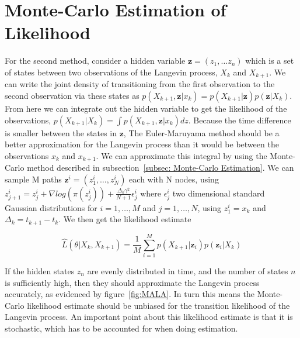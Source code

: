\section{Monte-Carlo Estimation of Likelihood}
\label{sec: Monte-Carlo Estimation}
For the second method, consider a hidden variable $\textbf{z} = (z_1, \dots z_n)$ which is a set of states between two  observations of the Langevin process, $X_k$ and $X_{k+1}$. We can write the joint density of transitioning from the first observation to the second observation via these states as $p(X_{k+1}, \textbf{z} | x_k) = p(X_{k+1}|\textbf{z})p(\textbf{z}|X_k)$. From here we can integrate out the hidden variable to get the likelihood of the observations, $p(X_{k+1}|X_k) = \int p(X_{k+1}, \textbf{z} | x_k)dz$. Because the time difference is smaller between the states in $\textbf{z}$, The Euler-Maruyama method should be a better approximation for the Langevin process than it would be between the observations $x_k$ and $x_{k+1}$.  We can approximate this integral by using the Monte-Carlo method described in subsection~\ref{subsec: Monte-Carlo Estimation}. We can sample M paths $\textbf{z}^i = (z_1^i, \dots,z_N^i)$ each with N nodes, using $z_{j+1}^i = z_j^i + \nabla log(\pi(z_j^i)) + \frac{\Delta_k\gamma^2}{N+1}\epsilon_j^i$ where $\epsilon_j^i$ two dimensional standard Gaussian distributions for $i=1, \dots , M$ and $j = 1,\dots , N$, using $z_1^i = x_k$ and $\Delta_k = t_{k+1}-t_k$. We then get the likelihood estimate

$$
\hat{L}(\theta|X_k, X_{k+1}) =  \frac{1}{M}\sum_{i=1}^M p(X_{k+1}|\textbf{z}_i)p(\textbf{z}_i|X_k)
\label{eq: montecarlo likelihood}
$$

If the hidden states $z_n$ are evenly distributed in time, and the number of states $n$ is sufficiently high, then they should approximate the Langevin process accurately, as evidenced by figure~\ref{fig:MALA}. In turn this means the Monte-Carlo likelihood estimate should be unbiased for the transition likelihood of the Langevin process. An important point about this likelihood estimate is that it is stochastic, which has to be accounted for when doing estimation. 

